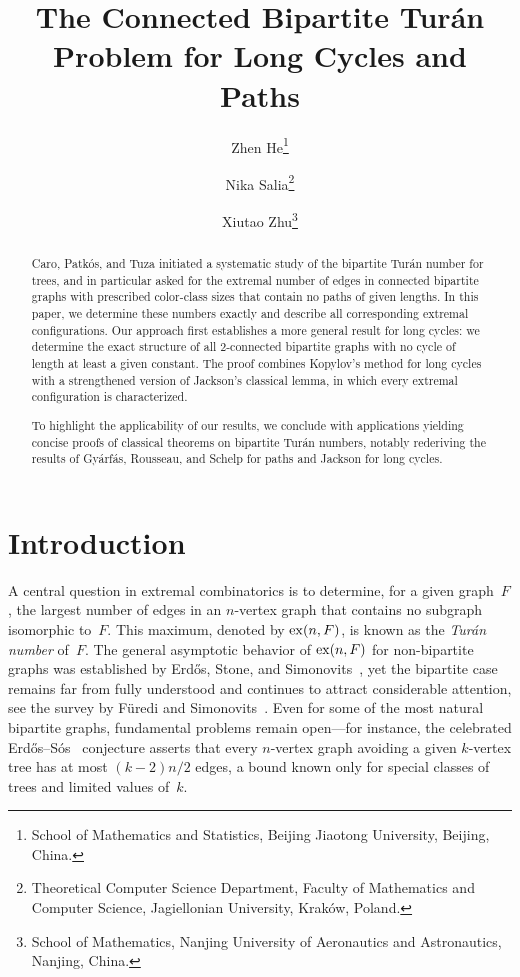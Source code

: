 \documentclass[11pt,a4paper]{article}
\newcommand{\ex}{{\rm ex}}
\begin{document}
\title{The Connected Bipartite Turán Problem for Long Cycles and Paths}
\author{
Zhen He\thanks{School of Mathematics and Statistics, Beijing Jiaotong University, Beijing, China.} \and
Nika Salia\thanks{Theoretical Computer Science Department, Faculty of Mathematics and Computer Science, Jagiellonian University, Krak\'{o}w, Poland.} \and
Xiutao Zhu\thanks{School of Mathematics, Nanjing University of Aeronautics and Astronautics, Nanjing, China.} \and
}
\date{}
\maketitle

\begin{abstract}
Caro, Patkós, and Tuza initiated a systematic study of the bipartite Turán number for trees, and in particular asked for the extremal number of edges in connected bipartite graphs with prescribed color-class sizes that contain no paths of given lengths.
In this paper, we determine these numbers exactly and describe all corresponding extremal configurations.
Our approach first establishes a more general result for long cycles: we determine the exact structure of all 2-connected bipartite graphs with no cycle of length at least a given constant.
The proof combines Kopylov’s method for long cycles with a strengthened version of Jackson’s classical lemma, in which every extremal configuration is characterized.


To highlight the applicability of our results, we conclude with applications yielding concise proofs of classical theorems on bipartite Turán numbers, notably rederiving the results of Gyárfás, Rousseau, and Schelp for paths and Jackson for long cycles.
\end{abstract}

\section{Introduction}

A central question in extremal combinatorics is to determine, for a given graph~$F$, the largest number of edges in an $n$-vertex graph that contains no subgraph isomorphic to~$F$.  
This maximum, denoted by $\ex(n, F)$, is known as the \emph{Turán number} of~$F$.  
The general asymptotic behavior of $\ex(n, F)$ for non-bipartite graphs was established by Erd\H{o}s, Stone, and Simonovits~\cite{erdos1946structure,erdHos1965limit}, yet the bipartite case remains far from fully understood and continues to attract considerable attention, see the survey by F{\"u}redi and Simonovits~\cite{furedi2013history}.
Even for some of the most natural bipartite graphs, fundamental problems remain open—for instance, the celebrated Erd\H{o}s–Sós~\cite{erd1964extremal} conjecture asserts that every $n$-vertex graph avoiding a given $k$-vertex tree has at most $(k-2)n/2$ edges, a bound known only for special classes of trees and limited values of~$k$.
\end{document}

